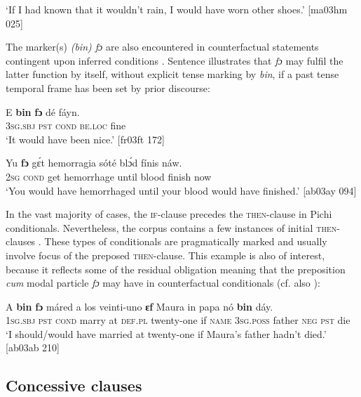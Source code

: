 \glt ‘If I had known that it wouldn’t rain, I would have worn
other shoes.’ [ma03hm 025]
\z

The marker(s) \textit{(bin) fɔ} are also encountered in counterfactual statements contingent upon inferred conditions . Sentence  illustrates that \textit{fɔ} may fulfil the latter function by itself, without explicit tense marking by \textit{bin}, if a past tense temporal frame has been set by prior discourse: 


\ea%
    \label{ex:key:1531}
    \gll E    \textbf{bin}    \textbf{fɔ}   dé    fáyn.\\
\textsc{3sg.sbj}  \textsc{pst}    \textsc{cond}    \textsc{be.loc}  fine\\

\glt ‘It would have been nice.’ [fr03ft 172]
\z


\ea%
    \label{ex:key:1532}
    \gll Yu  \textbf{fɔ}    gɛ́t  hemorragia  sóté    blɔ́d    fínis    náw.\\
\textsc{2sg}  \textsc{cond}    get  hemorrhage  until  blood  finish  now\\

\glt ‘You would have hemorrhaged until your blood would have finished.’ [ab03ay 094]
\z

In the vast majority of cases, the \textsc{if-}clause precedes the \textsc{then-}clause in Pichi conditionals. Nevertheless, the corpus contains a few instances of initial \textsc{then-}clauses . These types of conditionals are pragmatically marked and usually involve focus of the preposed \textsc{then-}clause. This example is also of interest, because it reflects some of the residual obligation meaning that the preposition \textit{cum} modal particle \textit{fɔ} may have in counterfactual conditionals (cf. also ): 


\ea%
    \label{ex:key:1533}
    \gll A    \textbf{bin}  \textbf{fɔ} máred  a  los    veinti-uno  \textbf{ɛf}  Maura
in    papa  nó  \textbf{bin}  dáy.\\
\textsc{1sg.sbj}  \textsc{pst}  \textsc{cond}    marry  at  \textsc{def.pl}  twenty-one  if  \textsc{name}
\textsc{3sg.poss}  father  \textsc{neg}  \textsc{pst}  die\\

\glt ‘I should/would have married at twenty-one if Maura’s father hadn’t died.’ [ab03ab 210]
\z

\subsection{Concessive clauses}\label{sec:10.7.12}

